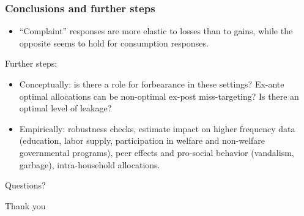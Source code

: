 \documentclass{beamer}
\begin{document}
\begin{frame}
\frametitle{Conclusions and further steps}
\begin{itemize}
	\item ``Complaint'' responses are more elastic to losses than to gains, while the opposite seems to hold for consumption responses.
\end{itemize}
Further steps:
\begin{itemize}
	\item Conceptually: is there a role for forbearance in these settings? Ex-ante optimal allocations can be non-optimal ex-post miss-targeting? Is there an optimal level of leakage?
	\item Empirically: robustness checks, estimate impact on higher frequency data (education, labor supply, participation in welfare and non-welfare governmental programs), peer effects and pro-social behavior (vandalism, garbage), intra-household allocations.
\end{itemize}

\end{frame}

\begin{frame}
\begin{center}
	{\Huge Questions?\par}
\end{center}
\end{frame}

\begin{frame}
\begin{center}
	{\Huge Thank you\par}
\end{center}
\end{frame}
\end{document}
